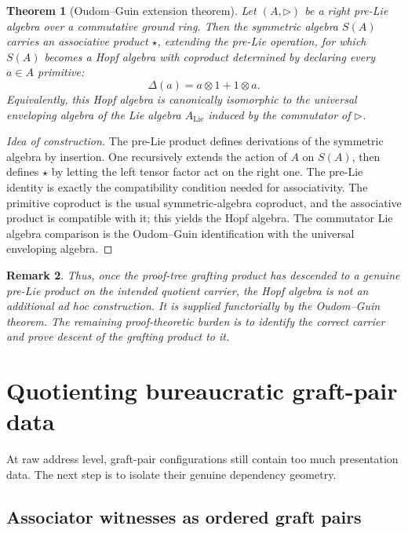 \documentclass[11pt]{article}
\newtheorem{theorem}{Theorem}
\newtheorem{remark}[theorem]{Remark}
\begin{document}
\begin{theorem}[Oudom--Guin extension theorem]
Let \((A,\triangleright)\) be a right pre-Lie algebra over a commutative
ground ring. Then the symmetric algebra \(S(A)\) carries an associative product
\(\star\), extending the pre-Lie operation, for which \(S(A)\) becomes a Hopf
algebra with coproduct determined by declaring every \(a\in A\) primitive:
\[
\Delta(a)=a\otimes 1+1\otimes a.
\]
Equivalently, this Hopf algebra is canonically isomorphic to the universal
enveloping algebra of the Lie algebra \(A_{\mathrm{Lie}}\) induced by the
commutator of \(\triangleright\).
\end{theorem}

\begin{proof}[Idea of construction]
The pre-Lie product defines derivations of the symmetric algebra by insertion.
One recursively extends the action of \(A\) on \(S(A)\), then defines
\(\star\) by letting the left tensor factor act on the right one. The pre-Lie
identity is exactly the compatibility condition needed for associativity. The
primitive coproduct is the usual symmetric-algebra coproduct, and the
associative product is compatible with it; this yields the Hopf algebra. The
commutator Lie algebra comparison is the Oudom--Guin identification with the
universal enveloping algebra.
\end{proof}

\begin{remark}
Thus, once the proof-tree grafting product has descended to a genuine pre-Lie
product on the intended quotient carrier, the Hopf algebra is not an additional
ad hoc construction. It is supplied functorially by the Oudom--Guin theorem.
The remaining proof-theoretic burden is to identify the correct carrier and
prove descent of the grafting product to it.
\end{remark}



\section{Quotienting bureaucratic graft-pair data}

At raw address level, graft-pair configurations still contain too much
presentation data. The next step is to isolate their genuine dependency
geometry.

\subsection{Associator witnesses as ordered graft pairs}
\end{document}
